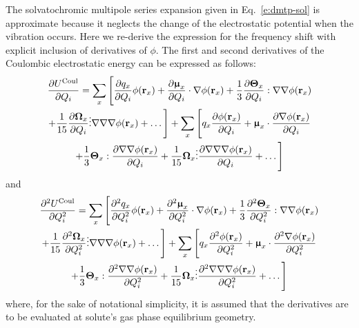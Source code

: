 \documentclass[a4paper,titlepage,twoside,fleqn,12pt]{book}
\newcommand{\BM}[1]{\bm{#1}}
\newcommand{\fderiv}[2]{\ensuremath{
\frac{\partial #1}{\partial #2}}}
\newcommand{\sderiv}[2]{\ensuremath{
\frac{\partial^2 #1}{\partial #2^2}
}}
\begin{document}
\begin{refsection}
The solvatochromic multipole series expansion given in Eq.~\eqref{e:dmtp-sol}
is approximate because it neglects the change of the electrostatic
potential when the vibration occurs. Here we re\hyp{}derive the 
expression for the frequency shift with explicit inclusion of derivatives
of $\phi$. The first and second derivatives of the Coulombic
electrostatic energy can be expressed as follows\citep{Blasiak.Cho.JCP.2014}:
%
\begin{multline} \label{x:726439}
 \fderiv{U^{\rm Coul}}{Q_i} =
%
\sum_x 
\Bigg[ 
  \fderiv{q_x}{Q_i} \phi({\bf r}_x) + 
  \fderiv{{\BM \upmu}_x}{Q_i} \cdot \nabla \phi({\bf r}_x) + \frac{1}{3}  
  \fderiv{{\BM \Theta}_x}{Q_i} : \nabla\nabla \phi({\bf r}_x) \\ + \frac{1}{15}   
  \fderiv{{\BM \Omega}_x}{Q_i} \vdots \nabla\nabla\nabla \phi({\bf r}_x) + \ldots 
\Bigg] 
%
+
%
\sum_x 
\Bigg[ 
  q_x \fderiv{\phi({\bf r}_x)}{Q_i} + 
  {\BM \upmu}_x \cdot \fderiv{\nabla \phi({\bf r}_x)}{Q_i} \\ + \frac{1}{3} 
  {\BM \Theta}_x : \fderiv{\nabla\nabla \phi({\bf r}_x)}{Q_i} + \frac{1}{15}
  {\BM \Omega}_x \vdots \fderiv{\nabla\nabla\nabla \phi({\bf r}_x)}{Q_i} + \ldots 
\Bigg]
\end{multline}
%
and
%
\begin{multline} \label{x:726440}
 \sderiv{U^{\rm Coul}}{Q_i} =
%
\sum_x 
\Bigg[ 
  \sderiv{q_x}{Q_i} \phi({\bf r}_x) + 
  \sderiv{{\BM \upmu}_x}{Q_i} \cdot \nabla \phi({\bf r}_x) + \frac{1}{3}  
  \sderiv{{\BM \Theta}_x}{Q_i} : \nabla\nabla \phi({\bf r}_x) \\ + \frac{1}{15}   
  \sderiv{{\BM \Omega}_x}{Q_i} \vdots \nabla\nabla\nabla \phi({\bf r}_x) + \ldots 
\Bigg] 
%
+
%
\sum_x 
\Bigg[ 
  q_x \sderiv{\phi({\bf r}_x)}{Q_i} + 
  {\BM \upmu}_x \cdot \sderiv{\nabla \phi({\bf r}_x)}{Q_i} \\ + \frac{1}{3} 
  {\BM \Theta}_x : \sderiv{\nabla\nabla \phi({\bf r}_x)}{Q_i} + \frac{1}{15}
  {\BM \Omega}_x \vdots \sderiv{\nabla\nabla\nabla \phi({\bf r}_x)}{Q_i} + \ldots 
\Bigg]
\end{multline}
%
where, for the sake of notational simplicity, 
it is assumed that the derivatives are to be evaluated at
solute's gas phase equilibrium geometry.


\end{refsection}
\end{document}
